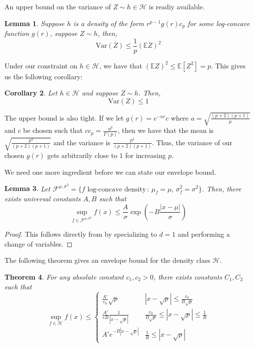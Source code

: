 \documentclass[12pt]{article}
\newtheorem{theorem}{Theorem}
\newtheorem{lemma}[theorem]{Lemma}
\newtheorem{corollary}[theorem]{Corollary}
\begin{document}
An upper bound on the variance of $Z \sim h \in \mathcal{H}$ is readiy available. 

\begin{lemma} \citet[Lemma 1]{bobkov2003spectral}
Suppose $h$ is a density of the form $r^{p-1} g(r) c_p$ for some log-concave function $g(r)$, suppose $Z \sim h$, then, 
\[
\mathrm{Var}(Z) \leq \frac{1}{p} (\mathbb{E} Z)^2 
\]
\end{lemma}

Under our constraint on $h \in \mathcal{H}$, we have that $(\mathbb{E} Z )^2 \leq \mathbb{E}[ Z^2] = p$. This gives us the following corollary:

\begin{corollary}
\label{Cor:VarUpperBound}
Let $h \in \mathcal{H}$ and suppose $Z \sim h$. Then,
\[
\mathrm{Var}(Z) \leq 1
\]
\end{corollary}

The upper bound is also tight. If we let $g(r) = e^{-a r} c$ where $a = \sqrt{\frac{(p+2)(p+1)}{p}}$ and $c$ be chosen such that $c c_p = \frac{a^p}{\Gamma(p)}$, then we have that the mean is $\sqrt{ \frac{p^3}{(p+2)(p+1)} }$ and the variance is $\frac{p^2}{(p+2)(p+1)}$. Thus, the variance of our chosen $g(r)$ gets arbitrarily close to $1$ for increasing $p$. 

We need one more ingredient before we can state our envelope bound. 

\begin{lemma}
\label{Lem:UnivariateMuSigmaEnvelope}
Let $\mathcal{F}^{\mu, \sigma^2} = \{ f \textrm{ log-concave density} \,:\, \mu_f = \mu,\, \sigma^2_f = \sigma^2 \}$. Then, there exists universal constants $A, B$ such that
\[
\sup_{f \in \mathcal{F}^{\mu, \sigma^2} } f(x) \leq \frac{A}{\sigma} \exp\left( - B \frac{| x - \mu |}{\sigma} \right)
\]
\end{lemma}

\begin{proof}
This follows directly from  \citet[Theorem 2]{kim2016global} by specializing to $d=1$ and performing a change of variables.
\end{proof}

The following theorem gives an envelope bound for the density class $\mathcal{H}$.
\begin{theorem}
For any absolute constant $c_1, c_2 > 0$, there exists constants $C_1, C_2$ such that
\[
\sup_{f \in \mathcal{H}} f(x) \leq 
  \left\{
   \begin{array}{cc} 
   \frac{A'}{c_0} \sqrt{p} & \left| x - \sqrt{p} \right| \leq \frac{c_0}{B \sqrt{p}} \\
   \frac{A'}{eB} \frac{1}{| x - \sqrt{p} |} & \frac{c_0}{B \sqrt{p}} \leq \left| x - \sqrt{p} \right| \leq \frac{1}{B} \\
   A' e^{ - B | x - \sqrt{p} | } & \frac{1}{B} \leq \left| x - \sqrt{p} \right|  
   \end{array} \right.
\]
\end{theorem}
\end{document}
